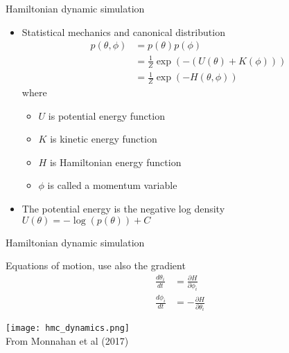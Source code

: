 \documentclass[finnish,english,t]{beamer}
\begin{document}
\begin{frame}{Hamiltonian dynamic simulation}

  \begin{itemize}
  \item Statistical mechanics and canonical distribution
    \begin{align*}
      p(\theta,\phi)&=p(\theta)p(\phi)\\
      &=\frac{1}{Z}\exp(-(U(\theta)+K(\phi)))\\
      &=\frac{1}{Z}\exp(-H(\theta,\phi))
    \end{align*}
    where
    \begin{itemize}
    \item $U$ is potential energy function
    \item $K$ is kinetic energy function
    \item $H$ is Hamiltonian energy function
    \item $\phi$ is called a momentum variable
    \end{itemize}
  \item<2-> The potential energy is the negative log density\\
    $U(\theta)=-\log(p(\theta))+C$
  \end{itemize}
  
  
\end{frame}

\begin{frame}{Hamiltonian dynamic simulation}

 Equations of motion, use also the gradient
  \begin{align*}
    \frac{d\theta_i}{dt} & = \frac{\partial H}{\partial \phi_i}\\
    \frac{d\phi_i}{dt} & = -\frac{\partial H}{\partial \theta_i}
  \end{align*}

  \texttt{[image: hmc\_dynamics.png]}\\
  {\footnotesize From Monnahan et al (2017)}
  
\end{frame}
\end{document}
